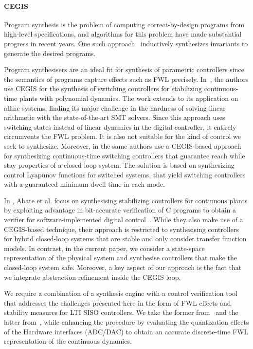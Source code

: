 \documentclass[runningheads,a4paper]{llncs}
\begin{document}
\paragraph{CEGIS}

Program synthesis is the problem of computing correct-by-design programs
from high-level specifications, and algorithms for this problem have made
substantial progress in recent years.  One such
approach~\cite{itzhaky2010simple} inductively synthesizes invariants to
generate the desired programs.

Program synthesisers are an ideal fit for synthesis of parametric
controllers since the semantics of programs capture effects such as FWL
precisely.  In~\cite{DBLP:conf/cdc/RavanbakhshS15}, the authors use CEGIS
for the synthesis of switching controllers for stabilizing continuous-time
plants with polynomial dynamics.  The work extends to its application on
affine systems, finding its major challenge in the hardness of solving
linear arithmetic with the state-of-the-art SMT solvers.  Since this
approach uses switching states instead of linear dynamics in the digital
controller, it entirely circumvents the FWL problem.  It is also not
suitable for the kind of control we seek to synthesize.
Moreover, in \cite{DBLP:conf/emsoft/RavanbakhshS16} the same authors 
use a CEGIS-based approach for synthesizing continuous-time switching
controllers that guarantee reach while stay properties of a closed
loop system. The solution is based on synthesizing control Lyapunov
functions for switched systems, that yield switching controllers with
a guaranteed minimum dwell time in each mode.

In \cite{DBLP:journals/corr/AbateBCCDKK16}, Abate et al.  focus on
synthesising stabilizing controllers for continuous plants
by exploiting advantage in bit-accurate verification of C programs 
to obtain a verifier for software-implemented digital control~\cite{Bessa16}.  
While they also make use of a CEGIS-based technique, their approach is
restricted to synthesising controllers for hybrid closed-loop systems
that are stable and only consider transfer function models.  In contrast,
in the current paper, we consider a state-space
representation of the physical system and synthesise controllers that
make the closed-loop system safe.  Moreover, 
a key aspect of our approach
is the fact that we integrate abstraction
refinement inside the CEGIS loop.

We require a combination of a synthesis engine with a control
verification tool that addresses the challenges presented here in the
form of FWL effects and stability measures for LTI SISO controllers.
We take the former from~\cite{DBLP:conf/lpar/DavidKL15} and the latter
from~\cite{daes20161}, while enhancing the procedure by evaluating the
quantization effects of the Hardware interfaces (ADC/DAC) to obtain an
accurate discrete-time FWL representation of the continuous dynamics.
\end{document}
